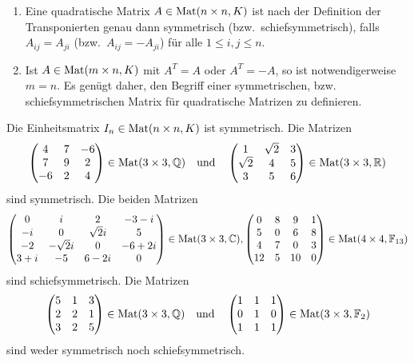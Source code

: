 \begin{bem}
 \begin{enumerate}[leftmargin=*]
  \item
   Eine quadratische Matrix $A \in \mathrm{Mat}(n \times n, K)$ ist nach der Definition der Transponierten genau dann symmetrisch (bzw.\ schiefsymmetrisch), falls $A_{ij} = A_{ji}$ (bzw.\ $A_{ij} = -A_{ji}$) für alle $1 \leq i,j \leq n$.
  \item
   Ist $A \in \mathrm{Mat}(m \times n, K)$ mit $A^T = A$ oder $A^T = -A$, so ist notwendigerweise $m = n$. Es genügt daher, den Begriff einer symmetrischen, bzw. schiefsymmetrischen Matrix für quadratische Matrizen zu definieren.
 \end{enumerate}
\end{bem}


\begin{bsp}
 Die Einheitsmatrix $I_n \in \mathrm{Mat}(n \times n, K)$ ist symmetrisch. Die Matrizen
 \[
  \begin{pmatrix}
    4 & 7 & -6 \\
    7 & 9 &  2 \\
   -6 & 2 &  4
  \end{pmatrix}
  \in \mathrm{Mat}(3 \times 3, \mathbb{Q})
  \quad\text{und}\quad
  \begin{pmatrix}
   1        & \sqrt{2} & 3 \\
   \sqrt{2} & 4        & 5 \\
   3        & 5        & 6
  \end{pmatrix}
  \in \mathrm{Mat}(3 \times 3, \mathbb{R})
 \]
 sind symmetrisch. Die beiden Matrizen
 \[
  \begin{pmatrix}
      0 & i          & 2         & -3-i   \\
     -i & 0          & \sqrt{2}i &  5    \\
     -2 & -\sqrt{2}i & 0         & -6+2i \\
    3+i & -5         & 6-2i      & 0
  \end{pmatrix}
  \in \mathrm{Mat}(3 \times 3, \mathbb{C}),
  \begin{pmatrix}
    0 & 8 &  9 & 1 \\
    5 & 0 &  6 & 8 \\
    4 & 7 &  0 & 3 \\
   12 & 5 & 10 & 0
  \end{pmatrix}
  \in \mathrm{Mat}(4 \times 4, \mathbb{F}_{13})
 \]
 sind schiefsymmetrisch. Die Matrizen
 \[
  \begin{pmatrix}
   5 & 1 & 3 \\
   2 & 2 & 1 \\
   3 & 2 & 5
  \end{pmatrix}
  \in \mathrm{Mat}(3 \times 3, \mathbb{Q})
  \quad\text{und}\quad
  \begin{pmatrix}
   1 & 1 & 1 \\
   0 & 1 & 0 \\
   1 & 1 & 1
  \end{pmatrix}
  \in \mathrm{Mat}(3 \times 3, \mathbb{F}_2)
 \]
 sind weder symmetrisch noch schiefsymmetrisch.
\end{bsp}


